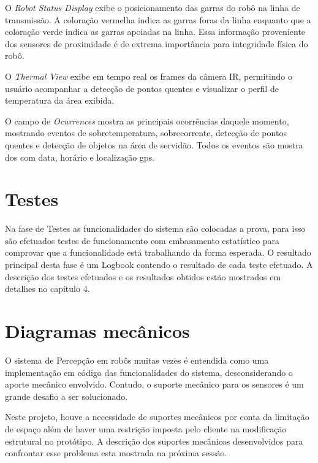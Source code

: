\begin{itemize}
O \textit{Robot Status Display} exibe o posicionamento das garras do robô na linha de transmissão. A coloração vermelha indica as garras foras da linha enquanto que a coloração verde indica as garras apoiadas na linha. Essa informação proveniente dos sensores de proximidade é de extrema importância para integridade física do robô.

O \textit{Thermal View} exibe em  tempo real os frames da câmera IR, permitindo o usuário acompanhar a detecção de pontos quentes e visualizar o perfil de temperatura da área exibida. 

O campo de \textit{Ocurrences} mostra as principais ocorrências daquele momento, mostrando eventos de sobretemperatura, sobrecorrente, detecção de pontos quentes e detecção de objetos na área de servidão. Todos os eventos são mostra
dos com data, horário e localização gps. 


\section{Testes}
Na fase de Testes as funcionalidades do sistema são colocadas a prova, para isso são efetuados testes de funcionamento com embasamento estatístico para comprovar que a funcionalidade está trabalhando da forma esperada. O resultado principal desta fase é um Logbook contendo o resultado de cada teste efetuado. A descrição dos testes efetuados e os resultados obtidos estão mostrados em detalhes no capítulo 4.

\section{Diagramas mecânicos}
\label{sec:diagm}
O sistema de Percepção em robôs muitas vezes é entendida como uma implementação em código das funcionalidades do sistema, desconsiderando o aporte mecânico envolvido. Contudo, o suporte mecânico para os sensores é um grande desafio a ser solucionado. 

Neste projeto, houve a necessidade de suportes mecânicos por conta da limitação de espaço além de haver uma restrição imposta pelo cliente na modificação estrutural no protótipo. A descrição dos suportes mecânicos desenvolvidos para confrontar esse problema esta mostrada na próxima sessão.
%


\end{itemize}
